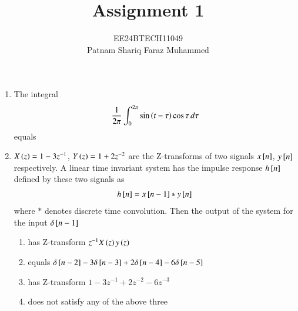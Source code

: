 \documentclass[journal]{IEEEtran}
\numberwithin{equation}{enumi}
\numberwithin{figure}{enumi}
\begin{document}


\title{Assignment 1}
\author{EE24BTECH11049 \\ Patnam Shariq Faraz Muhammed}

{\let\newpage\relax\maketitle}

\begin{enumerate}

    \item 
    The integral 
    \begin{align*}
        \frac{1}{2\pi} \int_0^{2\pi} \sin{\ensuremath{\left(t-\tau\right)}}\cos{\tau}\, d\tau
    \end{align*}
    equals
    \begin{enumerate}
    \end{enumerate}

    \item 
    $X\left(z\right) = 1 - 3z^{-1}$, $Y\left(z\right) = 1 + 2z^{-2}$ are the Z-transforms of two signals $x{}\left[n\right]$, $y{}\left[n\right]$ respectively. A linear time invariant system has the impulse response $h{}\left[n\right]$ defined by these two signals as 
    \begin{align*}
        h{}\left[n\right] = x{}\left[n-1\right] * y{}\left[n\right]
    \end{align*}
    where $*$ denotes discrete time convolution. Then the output of the system for the input $\delta{}\left[n-1\right]$
    \begin{enumerate}
        \item has Z-transform $z^{-1}X\left(z\right)y\left(z\right)$
        \item equals $\delta{}\left[n - 2\right] - 3\delta{}\left[n - 3\right] + 2\delta{}\left[n - 4\right] - 6\delta{}\left[n - 5\right]$
        \item has Z-transform $1 - 3z^{-1} + 2z^{-2} - 6z^{-3} $ 
        \item does not satisfy any of the above three
    \end{enumerate}


\end{enumerate}
\end{document}
